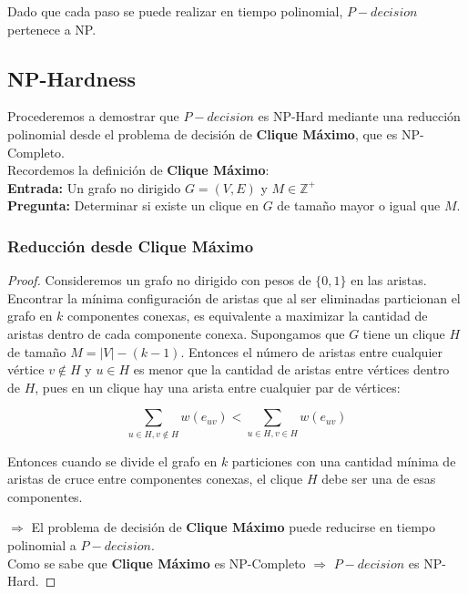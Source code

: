 \documentclass[a4paper,12pt]{article}
\begin{document}
Dado que cada paso se puede realizar en tiempo polinomial, $P-decision$ pertenece a NP.

\subsection{NP-Hardness}
Procederemos a demostrar que $P-decision$ es 
NP-Hard mediante una reducción polinomial desde el 
problema de decisión de \textbf{Clique Máximo}, que es NP-Completo.\\

Recordemos la definición de \textbf{Clique Máximo}:\\
\textbf{Entrada:} Un grafo no dirigido $G = (V, E)$ y $ M \in \mathbb{Z}^{+}$\\
\textbf{Pregunta:} Determinar si existe un clique en $G$ de tamaño mayor o igual que $M$.

\subsubsection{Reducción desde Clique Máximo}

\begin{proof}
    


Consideremos un grafo no dirigido con pesos de $\{0,1\}$ en las aristas. 
Encontrar la mínima configuración de aristas que al ser eliminadas particionan 
el grafo en $k$ componentes conexas, es equivalente a maximizar la cantidad de aristas 
dentro de cada componente conexa. Supongamos que $G$ tiene un clique $H$ de tamaño $M = |V| - (k-1)$.
Entonces el número de aristas entre cualquier vértice $v \notin H$ y $u \in H$ es menor que la 
cantidad de aristas entre vértices dentro de $H$, pues en un clique hay una arista entre cualquier
par de vértices:


\[
    \sum_{u \in H, v \notin H}w(e_{uv}) < \sum_{u \in H, v \in H} w(e_{uv})
\]

Entonces cuando se divide el grafo en $k$ particiones con una cantidad mínima de aristas de cruce entre componentes conexas, el clique $H$ debe ser una de esas componentes.

$\Rightarrow$ El problema de decisión de \textbf{Clique Máximo} puede reducirse en tiempo polinomial a $P-decision$. \\
Como se sabe que \textbf{Clique Máximo} es NP-Completo $\Rightarrow$ $P-decision$ es NP-Hard.

\end{proof}
\end{document}
